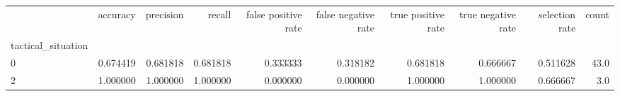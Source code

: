 \begin{tabular}{lrrrrrrrrr}
\toprule
{} &  accuracy &  precision &    recall &  false positive rate &  false negative rate &  true positive rate &  true negative rate &  selection rate &  count \\
tactical\_situation &           &            &           &                      &                      &                     &                     &                 &        \\
\midrule
0                  &  0.674419 &   0.681818 &  0.681818 &             0.333333 &             0.318182 &            0.681818 &            0.666667 &        0.511628 &   43.0 \\
2                  &  1.000000 &   1.000000 &  1.000000 &             0.000000 &             0.000000 &            1.000000 &            1.000000 &        0.666667 &    3.0 \\
\bottomrule
\end{tabular}
